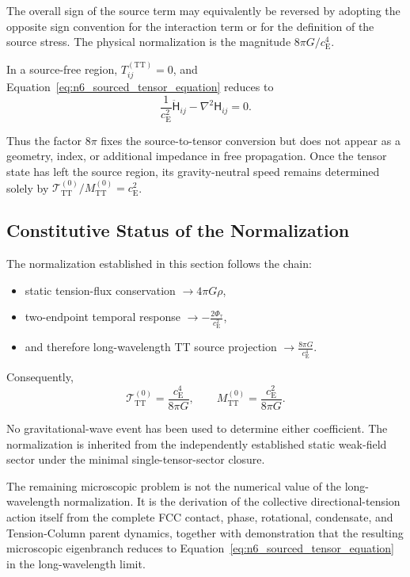 The overall sign of the source term may equivalently be reversed by adopting the opposite sign convention for the interaction term or for the definition of the source stress. The physical normalization is the magnitude $8\pi G / c_{\mathrm{E}}^{4}$.

In a source-free region, $T_{ij}^{(\mathrm{TT})} = 0$, and Equation~\eqref{eq:n6_sourced_tensor_equation} reduces to
\begin{equation}
    \frac{1}{c_{\mathrm{E}}^{2}} \ddot{\mathsf{H}}_{ij} - \nabla^{2}\mathsf{H}_{ij} = 0.
    \label{eq:n6_source_free_tensor_equation}
\end{equation}

Thus the factor $8\pi$ fixes the source-to-tensor conversion but does not appear as a geometry, index, or additional impedance in free propagation. Once the tensor state has left the source region, its gravity-neutral speed remains determined solely by $\mathcal{T}_{\mathrm{TT}}^{(0)} / M_{\mathrm{TT}}^{(0)} = c_{\mathrm{E}}^{2}$.

\subsection{Constitutive Status of the Normalization}
\label{subsec:n6_constitutive_status}

The normalization established in this section follows the chain:
\begin{itemize}
    \item static tension-flux conservation $\longrightarrow 4\pi G\rho$,
    \item two-endpoint temporal response $\longrightarrow - \frac{2\Phi_{\tau}}{c_{\mathrm{E}}^{2}}$,
    \item and therefore long-wavelength TT source projection $\longrightarrow \frac{8\pi G}{c_{\mathrm{E}}^{4}}$.
\end{itemize}

Consequently,
\begin{equation}
    \mathcal{T}_{\mathrm{TT}}^{(0)} = \frac{c_{\mathrm{E}}^{4}}{8\pi G}, \qquad M_{\mathrm{TT}}^{(0)} = \frac{c_{\mathrm{E}}^{2}}{8\pi G}.
\end{equation}

No gravitational-wave event has been used to determine either coefficient. The normalization is inherited from the independently established static weak-field sector under the minimal single-tensor-sector closure.

The remaining microscopic problem is not the numerical value of the long-wavelength normalization. It is the derivation of the collective directional-tension action itself from the complete FCC contact, phase, rotational, condensate, and Tension-Column parent dynamics, together with demonstration that the resulting microscopic eigenbranch reduces to Equation~\eqref{eq:n6_sourced_tensor_equation} in the long-wavelength limit.

